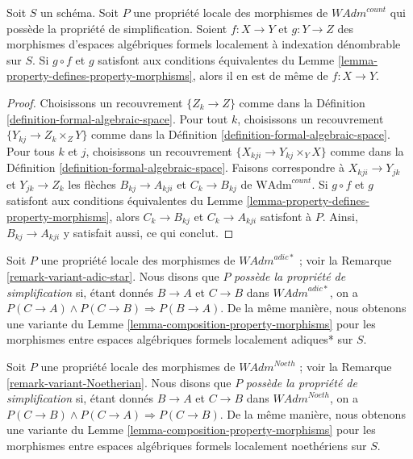\begin{lemma}
\label{lemma-permanence-property-morphisms}
Soit $S$ un schéma. Soit $P$ une propriété locale des morphismes de
$\textit{WAdm}^{count}$ qui possède la propriété de simplification.
Soient $f : X \to Y$ et $g : Y \to Z$ des morphismes d'espaces algébriques formels
localement à indexation dénombrable sur $S$. Si $g \circ f$ et $g$
satisfont aux conditions équivalentes du
Lemme \ref{lemma-property-defines-property-morphisms},
alors il en est de même de $f : X \to Y$.
\end{lemma}

\begin{proof}
Choisissons un recouvrement $\{Z_k \to Z\}$ comme dans la
Définition \ref{definition-formal-algebraic-space}.
Pour tout $k$, choisissons un recouvrement $\{Y_{kj} \to Z_k \times_Z Y\}$
comme dans la Définition \ref{definition-formal-algebraic-space}.
Pour tous $k$ et $j$, choisissons un recouvrement $\{X_{kji} \to Y_{kj} \times_Y X\}$
comme dans la Définition \ref{definition-formal-algebraic-space}.
Faisons correspondre à $X_{kji} \to Y_{jk}$ et $Y_{jk} \to Z_k$
les flèches
$B_{kj} \to A_{kji}$ et $C_k \to B_{kj}$ de
$\text{WAdm}^{count}$.
Si $g \circ f$ et $g$ satisfont aux conditions équivalentes du
Lemme \ref{lemma-property-defines-property-morphisms},
alors $C_k \to B_{kj}$ et $C_k \to A_{kji}$ satisfont à $P$.
Ainsi, $B_{kj} \to A_{kji}$ y satisfait aussi, ce qui conclut.
\end{proof}

\begin{remark}
\label{remark-permanence-variant-adic-star}
Soit $P$ une propriété locale des morphismes de $\textit{WAdm}^{adic*}$ ; voir la
Remarque \ref{remark-variant-adic-star}. Nous disons que $P$ {\it possède la propriété de
simplification} si, étant donnés $B \to A$ et $C \to B$ dans $\textit{WAdm}^{adic*}$,
on a $P(C \to A) \wedge P(C \to B) \Rightarrow P(B \to A)$.
De la même manière, nous obtenons une variante du
Lemme \ref{lemma-composition-property-morphisms}
pour les morphismes entre espaces algébriques formels localement adiques* sur $S$.
\end{remark}

\begin{remark}
\label{remark-permanence-variant-Noetherian}
Soit $P$ une propriété locale des morphismes de $\textit{WAdm}^{Noeth}$ ; voir la
Remarque \ref{remark-variant-Noetherian}. Nous disons que $P$
{\it possède la propriété de simplification} si, étant donnés $B \to A$ et $C \to B$
dans $\textit{WAdm}^{Noeth}$, on a
$P(C \to B) \wedge P(C \to A) \Rightarrow P(C \to B)$.
De la même manière, nous obtenons une variante du
Lemme \ref{lemma-composition-property-morphisms}
pour les morphismes entre espaces algébriques formels localement noethériens sur $S$.
\end{remark}














